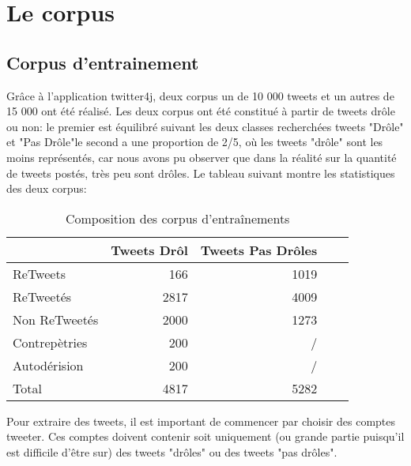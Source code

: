 \documentclass[10pt,a4paper,twoside]{article}
\begin{document}
\section{Le corpus}
\label{corpus}
\subsection{Corpus d'entrainement}

Grâce à l'application twitter4j, deux corpus un de 10 000 tweets et un autres de 15 000 ont été réalisé. Les deux corpus ont été constitué à partir de tweets drôle ou non:  le premier est équilibré suivant les deux classes recherchées tweets "Drôle" et "Pas Drôle"le second a une proportion de 2/5, où les tweets "drôle" sont les moins représentés, car nous avons pu observer que dans la réalité sur la quantité de tweets postés, très peu sont drôles. Le tableau suivant montre les statistiques des deux corpus: 

\begin{table}[!h]
\centering
	\begin{tabular}{lrrrr}
	\toprule
	& Tweets Drôl & Tweets Pas Drôles \\
	\midrule
	 ReTweets & 166 & 1019 \\
	
	 ReTweetés & 2817 & 4009 \\
	
	Non ReTweetés & 2000 & 1273 \\
	
	Contrepètries & 200 & / \\
	Autodérision & 200 & / \\
	 \midrule
	Total & 4817 & 5282 \\
	\bottomrule
	\end{tabular}
\caption{Composition des corpus d'entraînements}
\end{table}


Pour extraire des tweets, il est important de commencer par choisir des comptes tweeter. Ces comptes doivent contenir soit uniquement (ou grande partie puisqu'il est difficile d'être sur) des tweets "drôles" ou des tweets "pas drôles".
\end{document}

